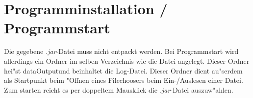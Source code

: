 \section{Programminstallation / Programmstart}
Die gegebene \emph{.jar}-Datei muss nicht entpackt werden. Bei Programmstart wird allerdings ein Ordner im selben Verzeichnis wie die Datei angelegt. Dieser Ordner hei"st \grqq dataOutput\grqq  und beinhaltet die Log-Datei. Dieser Ordner dient au"serdem als Startpunkt beim "Offnen eines Filechoosers beim Ein-/Auslesen einer Datei. Zum starten reicht es per doppeltem Mausklick die \emph{.jar}-Datei auszuw"ahlen.